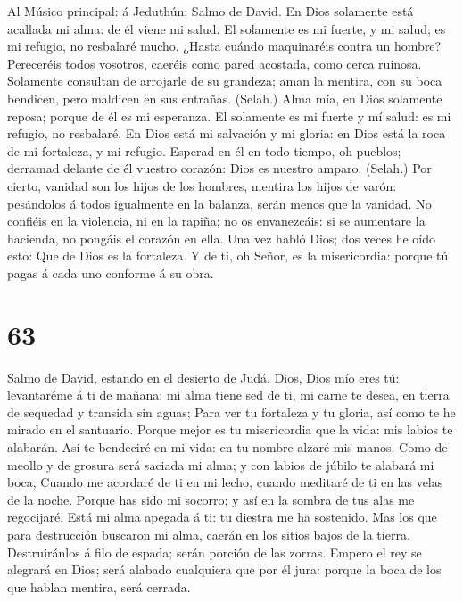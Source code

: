  Al Músico principal: á Jeduthún: Salmo de David. En Dios
solamente está acallada mi alma: de él viene mi salud.  El
solamente es mi fuerte, y mi salud; es mi refugio, no resbalaré mucho.
 ¿Hasta cuándo maquinaréis contra un hombre? Pereceréis
todos vosotros, caeréis como pared acostada, como cerca ruinosa.
 Solamente consultan de arrojarle de su grandeza; aman la
mentira, con su boca bendicen, pero maldicen en sus entrañas. (Selah.)
 Alma mía, en Dios solamente reposa; porque de él es mi
esperanza.  El solamente es mi fuerte y mí salud: es mi
refugio, no resbalaré.  En Dios está mi salvación y mi
gloria: en Dios está la roca de mi fortaleza, y mi refugio.
 Esperad en él en todo tiempo, oh pueblos; derramad
delante de él vuestro corazón: Dios es nuestro amparo. (Selah.)
 Por cierto, vanidad son los hijos de los hombres, mentira
los hijos de varón: pesándolos á todos igualmente en la balanza, serán
menos que la vanidad.  No confiéis en la violencia, ni en
la rapiña; no os envanezcáis: si se aumentare la hacienda, no pongáis el
corazón en ella.  Una vez habló Dios; dos veces he oído
esto: Que de Dios es la fortaleza.  Y de ti, oh Señor, es
la misericordia: porque tú pagas á cada uno conforme á su obra.

\hypertarget{section-62}{%
\section{63}\label{section-62}}

 Salmo de David, estando en el desierto de Judá. Dios,
Dios mío eres tú: levantaréme á ti de mañana: mi alma tiene sed de ti,
mi carne te desea, en tierra de sequedad y transida sin aguas;
 Para ver tu fortaleza y tu gloria, así como te he mirado
en el santuario.  Porque mejor es tu misericordia que la
vida: mis labios te alabarán.  Así te bendeciré en mi
vida: en tu nombre alzaré mis manos.  Como de meollo y de
grosura será saciada mi alma; y con labios de júbilo te alabará mi boca,
 Cuando me acordaré de ti en mi lecho, cuando meditaré de
ti en las velas de la noche.  Porque has sido mi socorro;
y así en la sombra de tus alas me regocijaré.  Está mi
alma apegada á ti: tu diestra me ha sostenido.  Mas los
que para destrucción buscaron mi alma, caerán en los sitios bajos de la
tierra.  Destruiránlos á filo de espada; serán porción de
las zorras.  Empero el rey se alegrará en Dios; será
alabado cualquiera que por él jura: porque la boca de los que hablan
mentira, será cerrada.

